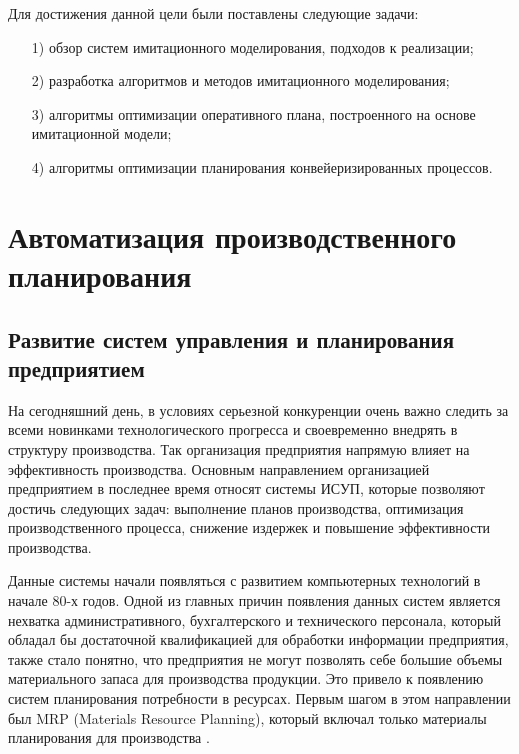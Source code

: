 Для достижения данной цели были поставлены следующие задачи:

\begin{enumerate}
    \item [1)]обзор систем имитационного моделирования, подходов к реализации;
    \item [2)]разработка алгоритмов и методов имитационного моделирования;
    \item [3)]алгоритмы оптимизации оперативного плана, построенного на основе имитационной модели;
    \item [4)]алгоритмы оптимизации планирования конвейеризированных процессов.
\end{enumerate}







\chapter{Автоматизация производственного планирования}
\section{Развитие систем управления и планирования предприятием}
На сегодняшний день, в условиях серьезной конкуренции очень важно следить за всеми новинками технологического прогресса и своевременно внедрять в структуру производства.
Так организация предприятия напрямую влияет на эффективность производства. Основным направлением организацией предприятием в последнее время относят системы ИСУП, которые позволяют достичь следующих задач: выполнение планов производства, оптимизация производственного процесса, снижение издержек и повышение эффективности производства.

Данные системы начали появляться с развитием компьютерных технологий в начале 80-х годов. Одной из главных причин появления данных систем является нехватка административного, бухгалтерского и технического персонала, который обладал бы достаточной квалификацией для обработки информации предприятия, также стало понятно, что предприятия не могут позволять себе большие объемы материального запаса для производства продукции. Это привело к появлению систем планирования потребности в ресурсах. Первым шагом в этом направлении был MRP (Materials Resource Planning), который включал только материалы планирования для производства \cite{MRP}.

